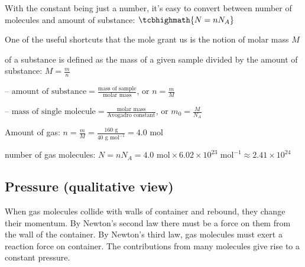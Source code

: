 With the constant being just a number, it's easy to convert between number of molecules and amount of substance: $\tcbhighmath{N=nN_A}$

One of the useful shortcuts that the mole grant us is the notion of molar mass $M$

\begin{ilight}
	 of a substance is defined as the mass of a given sample divided by the amount of substance: $M=\frac{m}{n}$
\end{ilight}

\begin{compactitem}
	\item[--] $\text{amount of substance} = \frac{\text{mass of sample}}{\text{molar mass}}$, or $n = \frac{m}{M}$
	
	\eqyskip
	
	\item[--] $\text{mass of single molecule} = \frac{\text{molar mass}}{\text{Avogadro constant}}$, or $m_0 = \frac{M}{N_A}$
\end{compactitem}


\begin{soln} Amount of gas: $n=\frac{m}{M} = \frac{160 \text{ g}}{40 \text{ g mol}^{-1}} = 4.0 \text{ mol}$

number of gas molecules: $N = n N_A = 4.0 \text{ mol} \times 6.02\times10^{23} \text{ mol}^{-1} \approx 2.41 \times 10^{24}$ \end{soln}

	




\subsection{Pressure (qualitative view)}

When gas molecules collide with walls of container and rebound, they change their momentum. By Newton's second law there must be a force on them from the wall of the container. By Newton's third law, gas molecules must exert a reaction force on container. The contributions from many molecules give rise to a constant pressure.


